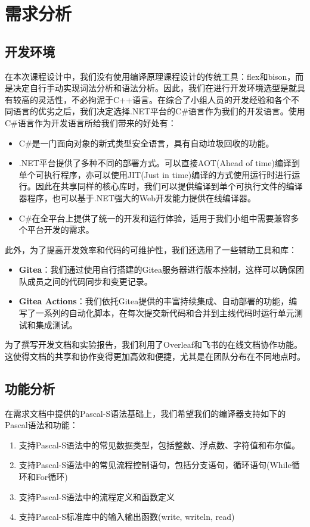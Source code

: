 \documentclass[../main.tex]{subfiles}
\begin{document}
\section{需求分析}


\subsection{开发环境}

在本次课程设计中，我们没有使用编译原理课程设计的传统工具：flex和bison，而是决定自行手动实现词法分析和语法分析。因此，我们在进行开发环境选型是就具有较高的灵活性，不必拘泥于C++语言。在综合了小组人员的开发经验和各个不同语言的优劣之后，我们决定选择.NET平台的C\#语言作为我们的开发语言。使用C\#语言作为开发语言所给我们带来的好处有：
\begin{itemize}
    \item C\#是一门面向对象的新式类型安全语言，具有自动垃圾回收的功能。
    \item .NET平台提供了多种不同的部署方式。可以直接AOT(Ahead of time)编译到单个可执行程序，亦可以使用JIT(Just in time)编译的方式使用运行时进行运行。因此在共享同样的核心库时，我们可以提供编译到单个可执行文件的编译器程序，也可以基于.NET强大的Web开发能力提供在线编译器。
    \item C\#在全平台上提供了统一的开发和运行体验，适用于我们小组中需要兼容多个平台开发的需求。
\end{itemize}

此外，为了提高开发效率和代码的可维护性，我们还选用了一些辅助工具和库：
\begin{itemize}
    \item \textbf{Gitea}：我们通过使用自行搭建的Gitea服务器进行版本控制，这样可以确保团队成员之间的代码同步和变更记录。
    \item \textbf{Gitea Actions}：我们依托Gitea提供的丰富持续集成、自动部署的功能，编写了一系列的自动化脚本，在每次提交新代码和合并到主线代码时运行单元测试和集成测试。
\end{itemize}

为了撰写开发文档和实验报告，我们利用了Overleaf和飞书的在线文档协作功能。这使得文档的共享和协作变得更加高效和便捷，尤其是在团队分布在不同地点时。

\subsection{功能分析}

在需求文档中提供的Pascal-S语法基础上，我们希望我们的编译器支持如下的Pascal语法和功能：
\begin{enumerate}
    \item 支持Pascal-S语法中的常见数据类型，包括整数、浮点数、字符值和布尔值。
    \item 支持Pascal-S语法中的常见流程控制语句，包括分支语句，循环语句(While循环和For循环)
    \item 支持Pascal-S语法中的流程定义和函数定义
    \item 支持Pascal-S标准库中的输入输出函数(write, writeln, read)
\end{enumerate}
\end{document}
